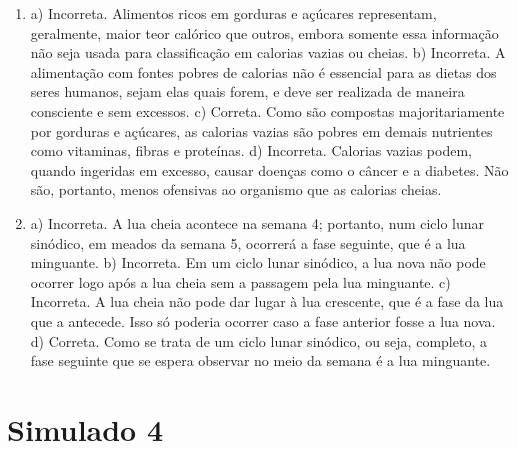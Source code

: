\begin{enumerate}
\item
a) Incorreta. Alimentos ricos em gorduras e açúcares representam,
geralmente, maior teor calórico que outros, embora somente essa
informação não seja usada para classificação em calorias vazias ou
cheias.
b) Incorreta. A alimentação com fontes pobres de calorias não é
essencial para as dietas dos seres humanos, sejam elas quais forem, e
deve ser realizada de maneira consciente e sem excessos.
c) Correta. Como são compostas majoritariamente por gorduras e açúcares,
as calorias vazias são pobres em demais nutrientes como vitaminas,
fibras e proteínas.
d) Incorreta. Calorias vazias podem, quando ingeridas em excesso, causar
doenças como o câncer e a diabetes. Não são, portanto, menos ofensivas
ao organismo que as calorias cheias.

\item
a) Incorreta. A lua cheia acontece na semana 4; portanto, num ciclo
lunar sinódico, em meados da semana 5, ocorrerá a fase seguinte, que é a
lua minguante.
b) Incorreta. Em um ciclo lunar sinódico, a lua nova não pode ocorrer
logo após a lua cheia sem a passagem pela lua minguante.
c) Incorreta. A lua cheia não pode dar lugar à lua crescente, que é a
fase da lua que a antecede. Isso só poderia ocorrer caso a fase anterior
fosse a lua nova.
d) Correta. Como se trata de um ciclo lunar sinódico, ou seja, completo,
a fase seguinte que se espera observar no meio da semana é a lua
minguante.
\end{enumerate}

\section*{Simulado 4}


